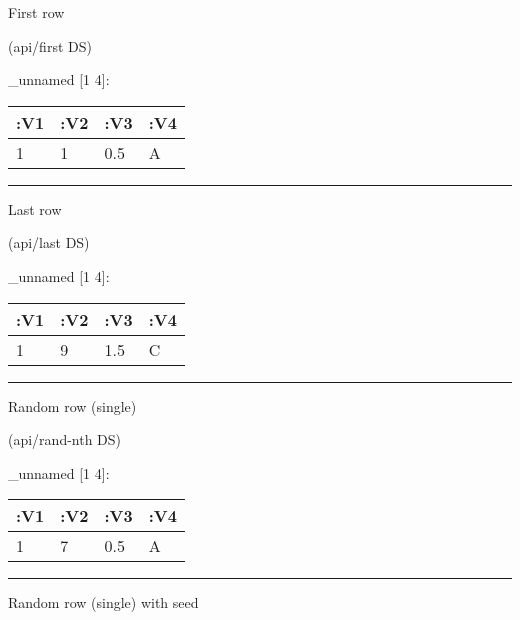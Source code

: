 \documentclass[]{article}
\newenvironment{Shaded}{\begin{snugshade}}{\end{snugshade}}
\newcommand{\NormalTok}[1]{#1}
\begin{document}
First row

\begin{Shaded}
\begin{Highlighting}[]
\NormalTok{(api/first DS)}
\end{Highlighting}
\end{Shaded}

\_unnamed {[}1 4{]}:

\begin{longtable}[]{@{}llll@{}}
\toprule
:V1 & :V2 & :V3 & :V4\tabularnewline
\midrule
\endhead
1 & 1 & 0.5 & A\tabularnewline
\bottomrule
\end{longtable}

\begin{center}\rule{0.5\linewidth}{0.5pt}\end{center}

Last row

\begin{Shaded}
\begin{Highlighting}[]
\NormalTok{(api/last DS)}
\end{Highlighting}
\end{Shaded}

\_unnamed {[}1 4{]}:

\begin{longtable}[]{@{}llll@{}}
\toprule
:V1 & :V2 & :V3 & :V4\tabularnewline
\midrule
\endhead
1 & 9 & 1.5 & C\tabularnewline
\bottomrule
\end{longtable}

\begin{center}\rule{0.5\linewidth}{0.5pt}\end{center}

Random row (single)

\begin{Shaded}
\begin{Highlighting}[]
\NormalTok{(api/rand-nth DS)}
\end{Highlighting}
\end{Shaded}

\_unnamed {[}1 4{]}:

\begin{longtable}[]{@{}llll@{}}
\toprule
:V1 & :V2 & :V3 & :V4\tabularnewline
\midrule
\endhead
1 & 7 & 0.5 & A\tabularnewline
\bottomrule
\end{longtable}

\begin{center}\rule{0.5\linewidth}{0.5pt}\end{center}

Random row (single) with seed
\end{document}
